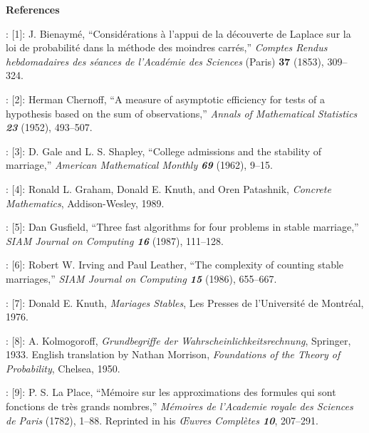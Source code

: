 \bigskip
\centerline{\bf References}

\medskip
\disleft 25pt:
[1]:
J. Bienaym\'e, ``Consid\'erations \`a l'appui de la d\'ecouverte de
Laplace sur la loi de probabilit\'e dans la m\'ethode des moindres
carr\'es,'' {\sl Comptes Rendus hebdomadaires des s\'eances de l'Acad\'emie des
 Sciences\/} (Paris) {\bf37} (1853), 309--324.

\smallskip
\disleft 25pt:
[2]:
Herman Chernoff, ``A measure of asymptotic efficiency for tests of a hypothesis
based on the sum of observations,''
{\sl Annals of Mathematical Statistics\/ \bf23} (1952), 493--507.

\smallskip
\disleft 25pt:
[3]:
D. Gale and L. S. Shapley, ``College admissions and the stability of
marriage,'' {\sl American Mathematical Monthly\/ \bf 69} (1962), 9--15.

\smallskip
\disleft 25pt:
[4]:
Ronald L. Graham, Donald E. Knuth, and Oren Patashnik, {\sl Concrete
Mathematics}, Addison-Wesley, 1989.

\smallskip
\disleft 25pt:
[5]:
Dan Gusfield, ``Three fast algorithms for four problems in stable marriage,''
{\sl SIAM Journal on Computing\/ \bf 16} (1987), 111--128.

\smallskip
\disleft 25pt:
[6]:
Robert W. Irving and Paul Leather, ``The complexity of counting stable
marriages,'' {\sl SIAM Journal on Computing\/ \bf 15} (1986), 655--667.

\smallskip
\disleft 25pt:
[7]:
Donald E. Knuth, 
{\sl Mariages Stables}, Les Presses de l'Universit\'e de Montr\'eal, 1976.

\smallskip
\disleft 25pt:
[8]:
A. Kolmogoroff, {\sl Grundbegriffe der Wahrscheinlichkeitsrechnung},
Springer, 1933. English translation by Nathan Morrison, {\sl Foundations
of the Theory of Probability}, Chelsea, 1950.

\smallskip
\disleft 25pt:
[9]:
P. S. La Place, ``M\'emoire sur les approximations des formules qui sont
fonctions de tr\`es grands nombres,'' {\sl M\'emoires de l'Academie royale
des Sciences de Paris\/} (1782), 1--88.
Reprinted in his {\sl \OE uvres Compl\`etes\/ \bf 10}, 207--291.


